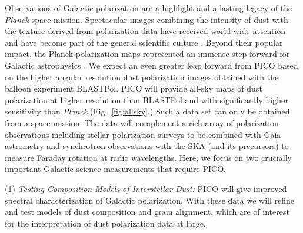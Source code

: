 \documentclass[PICOReport.tex]{subfiles}
\begin{document}
Observations of Galactic polarization are a highlight and a lasting legacy of the {\em Planck} space mission. 
Spectacular images combining the intensity of dust with the texture derived from polarization data 
have received world-wide attention and have become part of the general scientific culture \citep{PlanckI2015}. 
Beyond their popular impact, the Planck polarization maps represented an 
immense step forward for Galactic astrophysics \citep{Planck2018:XII}. 
We expect an even greater leap forward from PICO based on the higher angular resolution dust polarization images obtained with the balloon experiment BLASTPol.  
PICO will provide all-sky maps of dust polarization at higher resolution than BLASTPol and with significantly higher sensitivity than {\em Planck} (Fig.~\ref{fig:allsky}.)  Such a data set can only be obtained from a space mission. 
The data will complement a rich array of polarization observations including stellar polarization surveys to be 
combined with Gaia astrometry and synchrotron 
observations with the SKA (and its precursors) to measure
Faraday rotation at radio wavelengths. 
Here, we focus on two crucially important Galactic science measurements that require PICO. 

(1) {\em Testing Composition Models of Interstellar Dust:}
PICO will give improved spectral characterization of Galactic polarization. With these data we will refine and test models of dust composition and grain alignment, which are of interest for the interpretation of dust polarization data at large. 
\end{document}
